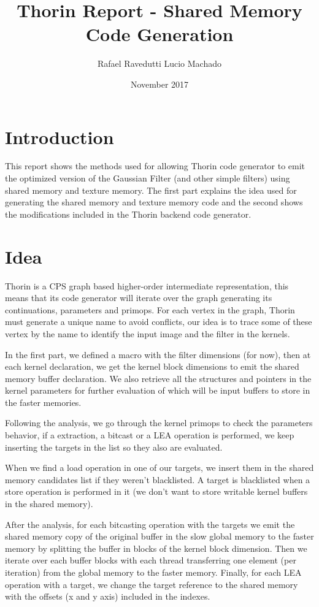 \documentclass{article}
\title{Thorin Report - Shared Memory Code Generation}
\author{Rafael Ravedutti Lucio Machado }
\date{November 2017}
\begin{document}
\maketitle

\section{Introduction}
This report shows the methods used for allowing Thorin code generator to emit the optimized version of the Gaussian Filter (and other simple filters) using shared memory and texture memory. The first part explains the idea used for generating the shared memory and texture memory code and the second shows the modifications included in the Thorin backend code generator.

\section{Idea}
Thorin is a CPS graph based higher-order intermediate representation, this means that its code generator will iterate over the graph generating its continuations, parameters and primops. For each vertex in the graph, Thorin must generate a unique name to avoid conflicts, our idea is to trace some of these vertex by the name to identify the input image and the filter in the kernels.

In the first part, we defined a macro with the filter dimensions (for now), then at each kernel declaration, we get the kernel block dimensions to emit the shared memory buffer declaration. We also retrieve all the structures and pointers in the kernel parameters for further evaluation of which will be input buffers to store in the faster memories.

Following the analysis, we go through the kernel primops to check the parameters behavior, if a extraction, a bitcast or a LEA operation is performed, we keep inserting the targets in the list so they also are evaluated.

When we find a load operation in one of our targets, we insert them in the shared memory candidates list if they weren't blacklisted. A target is blacklisted when a store operation is performed in it (we don't want to store writable kernel buffers in the shared memory).

After the analysis, for each bitcasting operation with the targets we emit the shared memory copy of the original buffer in the slow global memory to the faster memory by splitting the buffer in blocks of the kernel block dimension. Then we iterate over each buffer blocks with each thread transferring one element (per iteration) from the global memory to the faster memory. Finally, for each LEA operation with a target, we change the target reference to the shared memory with the offsets (x and y axis) included in the indexes.
\end{document}
